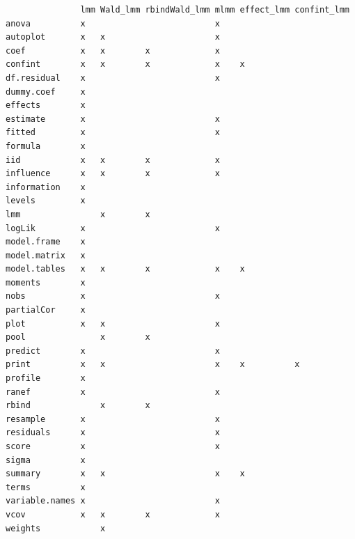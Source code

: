 \documentclass[12pt]{article}
\begin{document}
\label{}
\begin{verbatim}
               lmm Wald_lmm rbindWald_lmm mlmm effect_lmm confint_lmm
anova          x                          x                          
autoplot       x   x                      x                          
coef           x   x        x             x                          
confint        x   x        x             x    x                     
df.residual    x                          x                          
dummy.coef     x                                                     
effects        x                                                     
estimate       x                          x                          
fitted         x                          x                          
formula        x                                                     
iid            x   x        x             x                          
influence      x   x        x             x                          
information    x                                                     
levels         x                                                     
lmm                x        x                                        
logLik         x                          x                          
model.frame    x                                                     
model.matrix   x                                                     
model.tables   x   x        x             x    x                     
moments        x                                                     
nobs           x                          x                          
partialCor     x                                                     
plot           x   x                      x                          
pool               x        x                                        
predict        x                          x                          
print          x   x                      x    x          x          
profile        x                                                     
ranef          x                          x                          
rbind              x        x                                        
resample       x                          x                          
residuals      x                          x                          
score          x                          x                          
sigma          x                                                     
summary        x   x                      x    x                     
terms          x                                                     
variable.names x                          x                          
vcov           x   x        x             x                          
weights            x
\end{verbatim}
\end{document}
